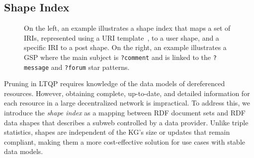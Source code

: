 

\subsection{Shape Index}

\begin{figure}
	\centering
	\begin{minipage}[t]{0.50\linewidth}
		\centering
		
	\end{minipage}
	\begin{minipage}[t]{0.45\linewidth}
		\centering
		
	\end{minipage}

	\caption{
		On the left, an example illustrates a shape index that maps a set of \acp{IRI}, represented using a \ac{URI} template~\cite{ietf6570Template}, to a user shape, and a specific \ac{IRI} to a post shape.
		On the right, an example illustrates a \ac{GSP} where the main subject is \texttt{?comment} and is linked to the \texttt{?message} and \texttt{?forum} star patterns.}
	\label{fig:shapeIndex}
\end{figure}

Pruning in \ac{LTQP} requires knowledge of the data models of dereferenced resources.
However, obtaining complete, up-to-date, and detailed information for each resource in a large decentralized network is impractical.
To address this, we introduce the \emph{shape index} as a mapping between \ac{RDF} document sets and \ac{RDF} data shapes that describes a subweb controlled by a data provider.
Unlike triple statistics, shapes are independent of the \ac{KG}'s size or updates that remain compliant, making them a more cost-effective solution for use cases with stable data models.

